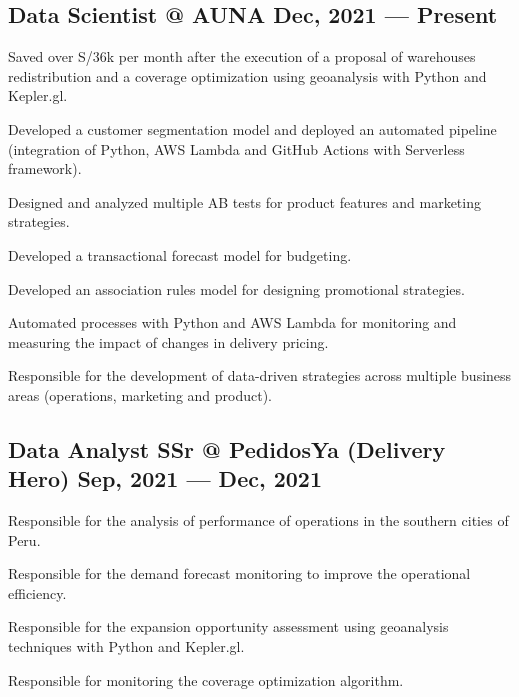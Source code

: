 \subsection{{Data Scientist @ AUNA \hfill Dec, 2021 --- Present}}
\begin{zitemize}
\item Saved over S/36k per month after the execution of a proposal of warehouses redistribution and a coverage optimization using geoanalysis with Python and Kepler.gl.
\item Developed a customer segmentation model and deployed an automated pipeline (integration of Python, AWS Lambda and GitHub Actions with Serverless framework).
\item Designed and analyzed multiple AB tests for product features and marketing strategies. \item Developed a transactional forecast model for budgeting.
\item Developed an association rules model for designing promotional strategies.
\item Automated processes with Python and AWS Lambda for monitoring and measuring the impact of changes in delivery pricing.
\item Responsible for the development of data-driven strategies across multiple business areas (operations, marketing and product).
\end{zitemize}

\subsection{{Data Analyst SSr @ PedidosYa (Delivery Hero) \hfill Sep, 2021 --- Dec, 2021}}
\begin{zitemize}
\item Responsible for the analysis of performance of operations in the southern cities of Peru.
\item Responsible for the demand forecast monitoring to improve the operational efficiency.
\item Responsible for the expansion opportunity assessment using geoanalysis techniques with Python and Kepler.gl.
\item Responsible for monitoring the coverage optimization algorithm.
\end{zitemize}

